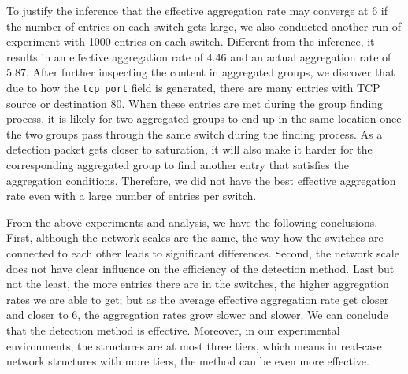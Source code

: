 To justify the inference that the effective aggregation rate may converge at 6 if the number of entries on each switch gets large, we also conducted another run of experiment with 1000 entries on each switch. Different from the inference, it results in an effective aggregation rate of 4.46 and an actual aggregation rate of 5.87. After further inspecting the content in aggregated groups, we discover that due to how the \texttt{tcp\_port} field is generated, there are many entries with TCP source or destination 80. When these entries are met during the group finding process, it is likely for two aggregated groups to end up in the same location once the two groups pass through the same switch during the finding process. As a detection packet gets closer to saturation, it will also make it harder for the corresponding aggregated group to find another entry that satisfies the aggregation conditions. Therefore, we did not have the best effective aggregation rate even with a large number of entries per switch. 

From the above experiments and analysis, we have the following conclusions. First, although the network scales are the same, the way how the switches are connected to each other leads to significant differences. Second, the network scale does not have clear influence on the efficiency of the detection method. Last but not the least, the more entries there are in the switches, the higher aggregation rates we are able to get; but as the average effective aggregation rate get closer and closer to 6, the aggregation rates grow slower and slower. We can conclude that the detection method is effective. Moreover, in our experimental environments, the structures are at most three tiers, which means in real-case network structures with more tiers, the method can be even more effective. 